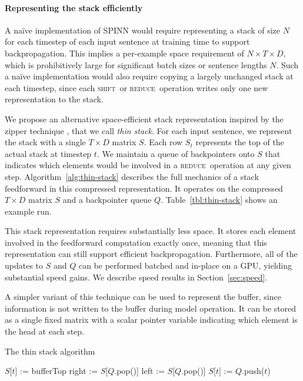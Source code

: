 \documentclass[11pt]{article}
\newcommand{\shift}{\textsc{shift}}
\newcommand{\reduce}{\textsc{reduce}}
\begin{document}
\paragraph{Representing the stack efficiently}

A na\"ive implementation of SPINN would require representing a stack of size $N$ for each timestep of each input sentence at training time to support backpropagation. This implies a per-example space requirement of $N \times T \times D$, which is prohibitively large for significant batch sizes or sentence lengths $N$. Such a na\"ive implementation would also require copying a largely unchanged stack at each timestep, since each \shift\ or \reduce\ operation writes only one new representation to the stack.

We propose an alternative space-efficient stack representation inspired by the zipper technique \citep{huet1997zipper}, that we call \textit{thin stack}. For each input sentence, we represent the stack with a single $T \times D$ matrix $S$. Each row $S_t$ represents the top of the actual stack at timestep $t$. We maintain a queue of backpointers onto $S$ that indicates which elements would be involved in a \reduce\ operation at any given step. Algorithm~\ref{alg:thin-stack} describes the full mechanics of a stack feedforward in this compressed representation. It operates on the compressed $T \times D$ matrix $S$ and a backpointer queue $Q$. Table~\ref{tbl:thin-stack} shows an example run.

This stack representation requires substantially less space. It stores each element involved in the feedforward computation exactly once, meaning that this representation can still support efficient backpropagation. Furthermore, all of the updates to $S$ and $Q$ can be performed batched and in-place on a GPU, yielding substantial speed gains. We describe speed results in Section~\ref{sec:speed}.

A simpler variant of this technique can be used to represent the buffer, since information is not written to the buffer during model operation. It can be stored as a single fixed matrix with a scalar pointer variable indicating which element is the head at each step.

\begin{algorithm}[t]
\caption{The thin stack algorithm}
\label{alg:thin-stack}
\begin{algorithmic}[1]
    \If{op = \shift}
      \State $S$[$t$] := bufferTop
    \ElsIf{op = \reduce}
      \State right := $S$[$Q$.pop()]
      \State left := $S$[$Q$.pop()]
      \State $S$[$t$] := 
    \EndIf
    \State $Q$.push($t$)
  \EndFunction
\end{algorithmic}
\end{algorithm}
\end{document}
